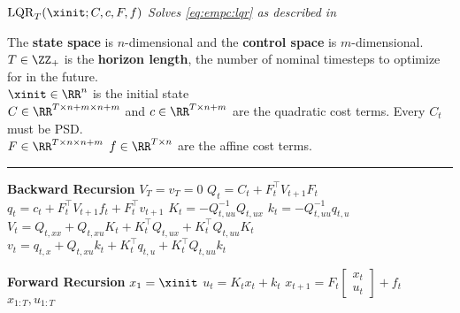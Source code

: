 \begin{algorithm}[h]
  \footnotesize
  \caption{
    $\mathrm{LQR}_T(\xinit; C, c, F, f)$ \hfill
    \emph{Solves \cref{eq:empc:lqr} as described
      in \cite{levine2017optimal}}}
The \textbf{state space} is $n$-dimensional
and the \textbf{control space} is $m$-dimensional. \\
$T\in\ZZ_+$ is the \textbf{horizon length}, the number of
nominal timesteps to optimize for in the future. \\
$\xinit\in\RR^n $ is the initial state \\
$C\in\RR^{T\times n+m\times n+m}$ and $c\in\RR^{T\times n+m}$ are the
quadratic cost terms. Every $C_t$ must be PSD. \\
$F\in\RR^{T\times n\times n+m}$ $f\in\RR^{T\times n}$ are the affine
cost terms.
\hrule
\label{alg:lqr}
\begin{algorithmic}
  \State \LeftComment \textbf{Backward Recursion}
  \State $V_T = v_T = 0$
  \State $Q_t = C_t+F_t^\top V_{t+1}F_t$
  \State $q_t = c_t+F_t^\top V_{t+1}f_t + F_t^\top v_{t+1}$
  \State $K_t = -Q_{t,uu}^{-1} Q_{t,ux}$
  \State $k_t = -Q_{t,uu}^{-1} q_{t,u}$
  \State $V_t = Q_{t,xx}+Q_{t,xu}K_t+K_t^\top Q_{t,ux}+K_t^\top Q_{t,uu}K_t$
  \State $v_t = q_{t,x}+Q_{t,xu}k_t+K_t^\top q_{t,u}+K_t^\top Q_{t,uu}k_t$
  \EndFor

  \State \LeftComment \textbf{Forward Recursion}
  \State $x_1 = \xinit$
  \State $u_t = K_t x_t + k_t$
  \State $x_{t+1} = F_t \begin{bmatrix}x_t \\ u_t \end{bmatrix}+ f_t$
  \EndFor
  \State
  \State \Return $x_{1:T}, u_{1:T}$
\end{algorithmic}
\end{algorithm}




